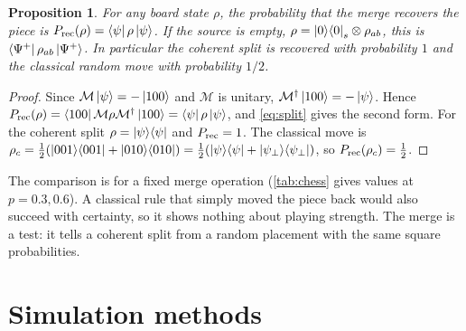 \documentclass[11pt,a4paper]{article}
\newtheorem{proposition}{Proposition}
\begin{document}
\begin{proposition}\label{prop:recovery}
For any board state $\rho$, the probability that the merge recovers the piece is $P_{\rm rec}(\rho)=\bra\psi\rho\ket\psi$. If the source is empty, $\rho=\ket0\!\bra0_s\otimes\rho_{ab}$, this is $\bra{\Psi^+}\rho_{ab}\ket{\Psi^+}$. In particular the coherent split is recovered with probability $1$ and the classical random move with probability $1/2$.
\end{proposition}
\begin{proof}
Since $\mathcal M\ket\psi=-\ket{100}$ and $\mathcal M$ is unitary, $\mathcal M^\dagger\ket{100}=-\ket\psi$. Hence $P_{\rm rec}(\rho)=\bra{100}\mathcal M\rho\mathcal M^\dagger\ket{100}=\bra\psi\rho\ket\psi$, and \cref{eq:split} gives the second form. For the coherent split $\rho=\ket\psi\!\bra\psi$ and $P_{\rm rec}=1$. The classical move is $\rho_c=\frac12(\ket{001}\!\bra{001}+\ket{010}\!\bra{010})=\frac12(\ket\psi\!\bra\psi+\ket{\psi_\perp}\!\bra{\psi_\perp})$, so $P_{\rm rec}(\rho_c)=\frac12$.
\end{proof}

The comparison is for a fixed merge operation (\cref{tab:chess} gives values at $p=0.3,0.6$). A classical rule that simply moved the piece back would also succeed with certainty, so it shows nothing about playing strength. The merge is a test: it tells a coherent split from a random placement with the same square probabilities.

\FloatBarrier
\section{Simulation methods}\label{sec:methods}
\end{document}
